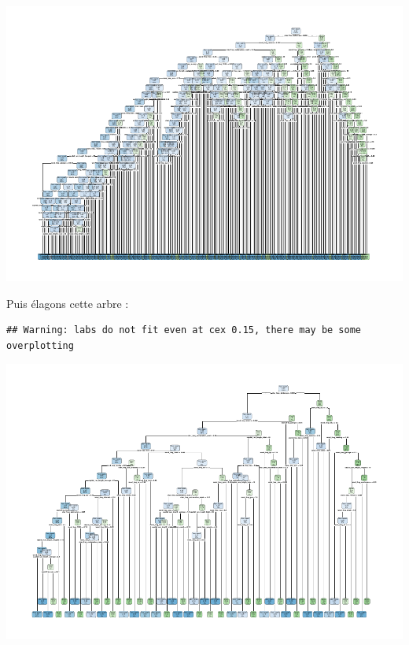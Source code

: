 \documentclass[]{article}
\newenvironment{Shaded}{\begin{snugshade}}{\end{snugshade}}
\newcommand{\DataTypeTok}[1]{\textcolor[rgb]{0.13,0.29,0.53}{#1}}
\newcommand{\FloatTok}[1]{\textcolor[rgb]{0.00,0.00,0.81}{#1}}
\newcommand{\KeywordTok}[1]{\textcolor[rgb]{0.13,0.29,0.53}{\textbf{#1}}}
\newcommand{\NormalTok}[1]{#1}
\newcommand{\OperatorTok}[1]{\textcolor[rgb]{0.81,0.36,0.00}{\textbf{#1}}}
\newcommand{\StringTok}[1]{\textcolor[rgb]{0.31,0.60,0.02}{#1}}
\begin{document}
\includegraphics{durand_eltarr_files/figure-latex/unnamed-chunk-23-1.pdf}

Puis élagons cette arbre :

\begin{Shaded}
\end{Shaded}

\begin{verbatim}
## Warning: labs do not fit even at cex 0.15, there may be some overplotting
\end{verbatim}

\includegraphics{durand_eltarr_files/figure-latex/unnamed-chunk-24-1.pdf}
\end{document}
